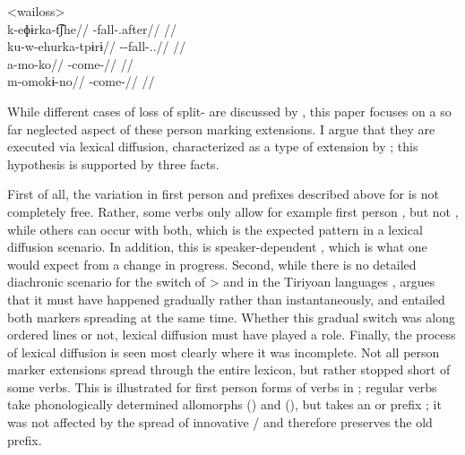 \pex<wailoss>
 \waiwai \parencite[][98]{waiwaihawkins1998}\\
\begingl
\gla k-eɸɨrka-t͡ʃhe//
\glb {}-fall-.after//
\glft {}//
\endgl
{} \kaxui \parencite[][49]{schuring2018kaxuyana}\\
\begingl
\gla ku-w-ehurka-tpɨrɨ//
\glb {}--fall-..//
\glft {}//
\endgl
{} \waiwai \parencite[][177]{waiwaihawkins1998}\\
\begingl
\gla a-mo-ko//
\glb {}-come-//
\glft {}//
\endgl
{} \hixka \parencite[][191]{hixkaryanaderby1985}\\
\begingl
\gla m-omokɨ-no//
\glb {}-come-//
\glft {}//
\endgl
\xe


While different cases of loss of split- are discussed by \textcite[91--96]{gildea1998}, this paper focuses on a so far neglected aspect of these person marking extensions.
I argue that they are executed via lexical diffusion, characterized as a type of extension by \textcite[106--115]{harris1995historical}; this hypothesis is supported by three facts.

First of all, the variation in first person and  prefixes described above for \kaxui is not completely free.
Rather, some verbs only allow for example first person , but not , while others can occur with both, which is the expected pattern in a lexical diffusion scenario.
In addition, this is speaker-dependent , which is what one would expect from a change in progress.
Second, while there is no detailed diachronic scenario for the switch of >  and  in the Tiriyoan languages , \textcite[111--112]{meira1998proto} argues that it must have happened gradually rather than instantaneously, and entailed both markers spreading at the same time.
Whether this gradual switch was along ordered lines or not, lexical diffusion must have played a role.
Finally, the process of lexical diffusion is seen most clearly where it was incomplete.
Not all person marker extensions spread through the entire lexicon, but rather stopped short of some verbs.
This is illustrated for \trio first person forms of  verbs in ; regular  verbs take phonologically determined allomorphs  () and  (), but   takes an  or  prefix ; it was not affected by the spread of innovative / and therefore preserves the old prefix.

